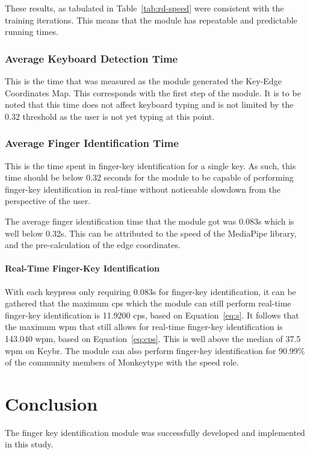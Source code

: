 \documentclass{report}
\begin{document}
These results, as tabulated in Table~\ref{tab:rd-speed} were consistent with the
training iterations. This means that the module has repeatable and predictable
running times.

\subsection{Average Keyboard Detection Time}
This is the time that was measured as the module generated the Key-Edge
Coordinates Map. This corresponds with the first step of the module. It is to be
noted that this time does not affect keyboard typing and is not limited by the
0.32 threshold as the user is not yet typing at this point.

\subsection{Average Finger Identification Time}
This is the time spent in finger-key identification for a single key. As such,
this time should be below 0.32 seconds for the module to be capable of
performing finger-key identification in real-time without noticeable slowdown
from the perspective of the user.

The average finger identification time that the module got was 0.083s which is
well below 0.32s. This can be attributed to the speed of the MediaPipe library,
and the pre-calculation of the edge coordinates.

\subsubsection{Real-Time Finger-Key Identification}
With each keypress only requiring 0.083s for finger-key identification, it can
be gathered that the maximum \ac{cps} which the module can still perform
real-time finger-key identification is 11.9200 \ac{cps}, based on
Equation~\ref{eq:s}. It follows that the maximum \ac{wpm} that still allows for
real-time finger-key identification is 143.040 \ac{wpm}, based on
Equation~\ref{eq:cps}. This is well above the median of 37.5 \ac{wpm} on Keybr.
The module can also perform finger-key identification for 90.99\% of the
community members of Monkeytype with the speed role.

\chapter{Conclusion}

The finger key identification module was successfully developed and implemented
in this study.
\end{document}
